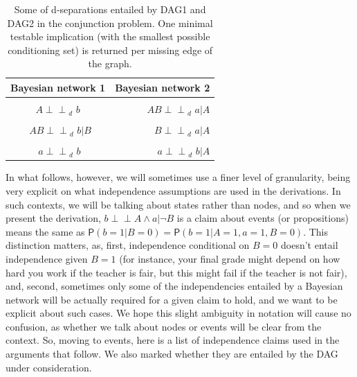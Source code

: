\documentclass[
  10pt,
  dvipsnames,enabledeprecatedfontcommands]{scrartcl}
\newcommand{\indep}{\!\perp \!\!\! \perp\!}
\newcommand{\n}{\neg}
\newcommand{\et}{\wedge}
\newcommand{\pr}[1]{\ensuremath{\mathsf{P}(#1)}}
\begin{document}
\begin{table}[h]
\begin{tabular}{cr}
\toprule
Bayesian network 1  & Bayesian network 2\\
\midrule
\cellcolor{gray!6}{$A   \indep_d\,\, B  $}&\cellcolor{gray!6}{     $ A  \indep_d\,\, b \vert  B  $} \\
$A   \indep_d\,\, b  $& $AB  \indep_d\,\,  a \vert  A$\\
\cellcolor{gray!6}{$\,\,\, AB  \indep_d\,\, a \vert A $}  & \cellcolor{gray!6}{$AB  \indep_d\,\,  b \vert  B $}\\
$\,\,\, AB  \indep_d\,\, b \vert B  $ & $ B  \indep_d\,\,  a \vert  A $\\
\cellcolor{gray!6}{$B   \indep_d\,\, a $}        & \cellcolor{gray!6}{$a  \indep_d\,\,  b \vert  B$ }\\
$\,\, a    \indep_d\,\, b$    & $a  \indep_d\,\,  b \vert  A $ \\
\bottomrule
\end{tabular}
\caption{Some of d-separations entailed by \textsf{DAG1} and \textsf{DAG2} in the conjunction problem. One minimal testable implication (with the smallest possible conditioning set) is returned per missing edge of the graph.} 
\label{tab:indepBNS}
\end{table}

In what follows, however, we will sometimes use a finer level of
granularity, being very explicit on what independence assumptions are
used in the derivations. In such contexts, we will be talking about
states rather than nodes, and so when we present the derivation,
\mbox{$b\indep A \et a \vert \n B$} is a claim about events (or
propositions) means the same as
\(\pr{b = 1 \vert B = 0} = \pr{b = 1 \vert A = 1, a = 1, B = 0}\). This
distinction matters, as, first, independence conditional on \(B= 0\)
doesn't entail independence given \(B=1\) (for instance, your final
grade might depend on how hard you work if the teacher is fair, but this
might fail if the teacher is not fair), and, second, sometimes only some
of the independencies entailed by a Bayesian network will be actually
required for a given claim to hold, and we want to be explicit about
such cases. We hope this slight ambiguity in notation will cause no
confusion, as whether we talk about nodes or events will be clear from
the context. So, moving to events, here is a list of independence claims
used in the arguments that follow. We also marked whether they are
entailed by the DAG under consideration.
\end{document}
